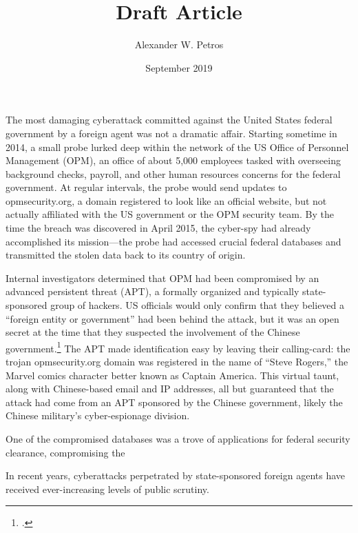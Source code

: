 \documentclass[12pt]{article}
\title{Draft Article}
\author{Alexander W. Petros}
\date{September 2019}
\begin{document}
\maketitle
\newpage

The most damaging cyberattack committed against the United States federal government by a foreign agent was not a dramatic affair. Starting sometime in 2014, a small probe lurked deep within the network of the US Office of Personnel Management (OPM), an office of about 5,000 employees tasked with overseeing background checks, payroll, and other human resources concerns for the federal government. At regular intervals, the probe would send updates to opmsecurity.org, a domain registered to look like an official website, but not actually affiliated with the US government or the OPM security team. By the time the breach was discovered in April 2015, the cyber-spy had already accomplished its mission---the probe had accessed crucial federal databases and transmitted the stolen data back to its country of origin.

Internal investigators determined that OPM had been compromised by an advanced persistent threat (APT), a formally organized and typically state-sponsored group of hackers. US officials would only confirm that they believed a \enquote{foreign entity or government} had been behind the attack, but it was an open secret at the time that they suspected the involvement of the Chinese government.\footcite{spetalnick_china_2015} The APT made identification easy by leaving their calling-card: the trojan opmsecurity.org domain was registered in the name of \enquote{Steve Rogers,} the Marvel comics character better known as Captain America. This virtual taunt, along with Chinese-based email and IP addresses, all but guaranteed that the attack had come from an APT sponsored by the Chinese government, likely the Chinese military's cyber-espionage division.

One of the compromised databases was a trove of applications for federal security clearance, compromising the


In recent years, cyberattacks perpetrated by state-sponsored foreign agents have received ever-increasing levels of public scrutiny.
\end{document}
